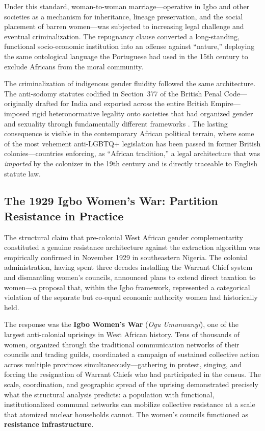 Under this standard, woman-to-woman marriage---operative in Igbo and other societies as a mechanism for inheritance, lineage preservation, and the social placement of barren women---was subjected to increasing legal challenge and eventual criminalization. The repugnancy clause converted a long-standing, functional socio-economic institution into an offense against ``nature,'' deploying the same ontological language the Portuguese had used in the 15th century to exclude Africans from the moral community.

The criminalization of indigenous gender fluidity followed the same architecture. The anti-sodomy statutes codified in Section~377 of the British Penal Code---originally drafted for India and exported across the entire British Empire---imposed rigid heteronormative legality onto societies that had organized gender and sexuality through fundamentally different frameworks \cite{colonialism_sogi_ilga, colonialism_homosexuality}. The lasting consequence is visible in the contemporary African political terrain, where some of the most vehement anti-LGBTQ+ legislation has been passed in former British colonies---countries enforcing, as ``African tradition,'' a legal architecture that was \textit{imported} by the colonizer in the 19th century and is directly traceable to English statute law.

\subsection{The 1929 Igbo Women's War: Partition Resistance in Practice}
\label{sec:womens_war}

The structural claim that pre-colonial West African gender complementarity constituted a genuine resistance architecture against the extraction algorithm was empirically confirmed in November 1929 in southeastern Nigeria. The colonial administration, having spent three decades installing the Warrant Chief system and dismantling women's councils, announced plans to extend direct taxation to women---a proposal that, within the Igbo framework, represented a categorical violation of the separate but co-equal economic authority women had historically held.

The response was the \textbf{Igbo Women's War} (\textit{Ogu Umunwanyi}), one of the largest anti-colonial uprisings in West African history. Tens of thousands of women, organized through the traditional communication networks of their councils and trading guilds, coordinated a campaign of sustained collective action across multiple provinces simultaneously---gathering in protest, singing, and forcing the resignation of Warrant Chiefs who had participated in the census. The scale, coordination, and geographic spread of the uprising demonstrated precisely what the structural analysis predicts: a population with functional, institutionalized communal networks can mobilize collective resistance at a scale that atomized nuclear households cannot. The women's councils functioned as \textbf{resistance infrastructure}.

